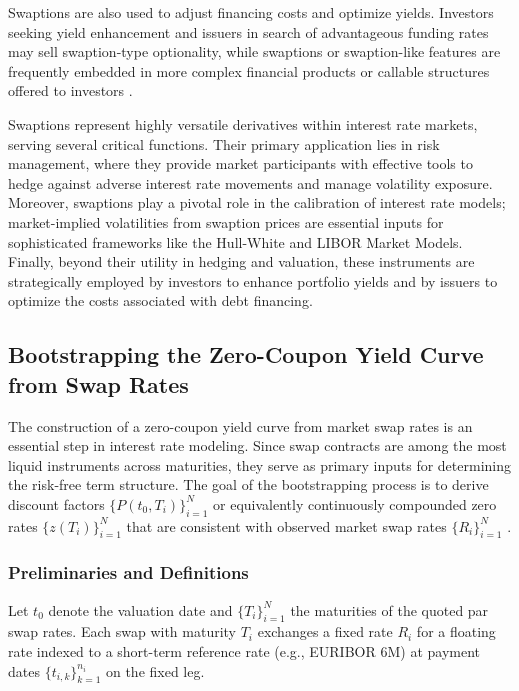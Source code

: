Swaptions are also used to adjust financing costs and optimize yields. Investors seeking yield enhancement and issuers in search of advantageous funding rates may sell swaption-type optionality, while swaptions or swaption-like features are frequently embedded in more complex financial products or callable structures offered to investors \parencite[p.~22]{rebonato2004interest}.

Swaptions represent highly versatile derivatives within interest rate markets, serving several critical functions. Their primary application lies in risk management, where they provide market participants with effective tools to hedge against adverse interest rate movements and manage volatility exposure. Moreover, swaptions play a pivotal role in the calibration of interest rate models; market-implied volatilities from swaption prices are essential inputs for sophisticated frameworks like the Hull-White and LIBOR Market Models. Finally, beyond their utility in hedging and valuation, these instruments are strategically employed by investors to enhance portfolio yields and by issuers to optimize the costs associated with debt financing.

\subsection{Bootstrapping the Zero-Coupon Yield Curve from Swap Rates}
\label{subsec:bootstrap_zero_curve}
The construction of a zero-coupon yield curve from market swap rates is an essential step in interest rate modeling. Since swap contracts are among the most liquid instruments across maturities, they serve as primary inputs for determining the risk-free term structure. The goal of the bootstrapping process is to derive discount factors $\{P(t_0, T_i)\}_{i=1}^N$ or equivalently continuously compounded zero rates $\{z(T_i)\}_{i=1}^N$ that are consistent with observed market swap rates $\{R_i\}_{i=1}^N$ \parencite[pp.~84--86]{hull2015optionsfutures}.

\subsubsection{Preliminaries and Definitions}
Let $t_0$ denote the valuation date and $\{T_i\}_{i=1}^N$ the maturities of the quoted par swap rates. Each swap with maturity $T_i$ exchanges a fixed rate $R_i$ for a floating rate indexed to a short-term reference rate (e.g., EURIBOR 6M) at payment dates $\{t_{i,k}\}_{k=1}^{n_i}$ on the fixed leg.  

